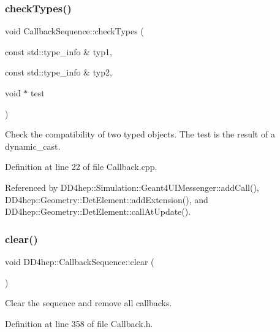\subsubsection{\texorpdfstring{check\+Types()}{checkTypes()}}
{\footnotesize\ttfamily void Callback\+Sequence\+::check\+Types (\begin{DoxyParamCaption}\item[{const std\+::type\+\_\+info \&}]{typ1,  }\item[{const std\+::type\+\_\+info \&}]{typ2,  }\item[{void $\ast$}]{test }\end{DoxyParamCaption})\hspace{0.3cm}{\ttfamily [static]}}



Check the compatibility of two typed objects. The test is the result of a dynamic\+\_\+cast. 



Definition at line 22 of file Callback.\+cpp.



Referenced by D\+D4hep\+::\+Simulation\+::\+Geant4\+U\+I\+Messenger\+::add\+Call(), D\+D4hep\+::\+Geometry\+::\+Det\+Element\+::add\+Extension(), and D\+D4hep\+::\+Geometry\+::\+Det\+Element\+::call\+At\+Update().

\hypertarget{struct_d_d4hep_1_1_callback_sequence_a3a410a493cc8cd2424b70c9dd2f0a7e9}{}\label{struct_d_d4hep_1_1_callback_sequence_a3a410a493cc8cd2424b70c9dd2f0a7e9} 
\subsubsection{\texorpdfstring{clear()}{clear()}}
{\footnotesize\ttfamily void D\+D4hep\+::\+Callback\+Sequence\+::clear (\begin{DoxyParamCaption}{ }\end{DoxyParamCaption})\hspace{0.3cm}{\ttfamily [inline]}}



Clear the sequence and remove all callbacks. 



Definition at line 358 of file Callback.\+h.



